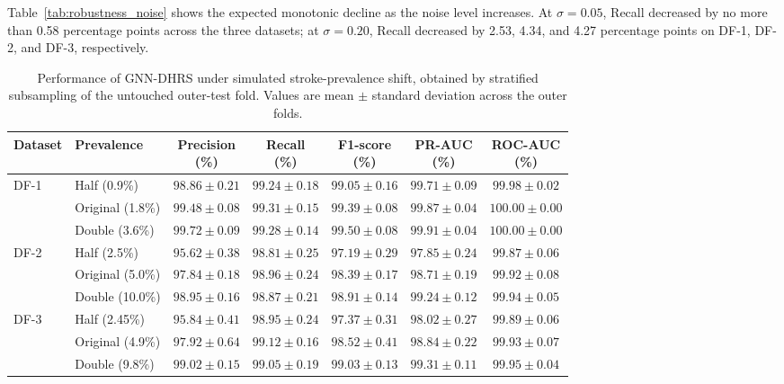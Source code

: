 \documentclass[pdflatex,sn-mathphys-num]{sn-jnl}%
\theoremstyle{thmstyleone}%
\theoremstyle{thmstyletwo}%
\theoremstyle{thmstylethree}%
\begin{document}
{ {
Table~\ref{tab:robustness_noise} shows the expected monotonic decline as the
noise level increases. At $\sigma=0.05$, Recall decreased by no more than
0.58 percentage points across the three datasets; at $\sigma=0.20$, Recall
decreased by 2.53, 4.34, and 4.27 percentage points on DF-1, DF-2, and DF-3,
respectively.
}

\begingroup
 
\begin{table}[!ht]
\centering
\caption{
Performance of GNN-DHRS under simulated stroke-prevalence shift, obtained by
stratified subsampling of the untouched outer-test fold. Values are mean
$\pm$ standard deviation across the outer folds.
}
\label{tab:robustness_prevalence}
\small
\setlength{\tabcolsep}{4.5pt}
\renewcommand{\arraystretch}{1.08}
\begin{tabular}{@{}llccccc@{}}
\toprule
\textbf{Dataset} & \textbf{Prevalence} &
\shortstack{\textbf{Precision}\\\textbf{(\%)}} &
\shortstack{\textbf{Recall}\\\textbf{(\%)}} &
\shortstack{\textbf{F1-score}\\\textbf{(\%)}} &
\shortstack{\textbf{PR-AUC}\\\textbf{(\%)}} &
\shortstack{\textbf{ROC-AUC}\\\textbf{(\%)}} \\
\midrule
\multirow{3}{*}{DF-1}
& Half (0.9\%)     & $98.86\pm0.21$ & $99.24\pm0.18$ & $99.05\pm0.16$ & $99.71\pm0.09$ & $99.98\pm0.02$ \\
& Original (1.8\%) & $99.48\pm0.08$ & $99.31\pm0.15$ & $99.39\pm0.08$ & $99.87\pm0.04$ & $100.00\pm0.00$ \\
& Double (3.6\%)   & $99.72\pm0.09$ & $99.28\pm0.14$ & $99.50\pm0.08$ & $99.91\pm0.04$ & $100.00\pm0.00$ \\
\midrule
\multirow{3}{*}{DF-2}
& Half (2.5\%)     & $95.62\pm0.38$ & $98.81\pm0.25$ & $97.19\pm0.29$ & $97.85\pm0.24$ & $99.87\pm0.06$ \\
& Original (5.0\%) & $97.84\pm0.18$ & $98.96\pm0.24$ & $98.39\pm0.17$ & $98.71\pm0.19$ & $99.92\pm0.08$ \\
& Double (10.0\%)  & $98.95\pm0.16$ & $98.87\pm0.21$ & $98.91\pm0.14$ & $99.24\pm0.12$ & $99.94\pm0.05$ \\
\midrule
\multirow{3}{*}{DF-3}
& Half (2.45\%)    & $95.84\pm0.41$ & $98.95\pm0.24$ & $97.37\pm0.31$ & $98.02\pm0.27$ & $99.89\pm0.06$ \\
& Original (4.9\%) & $97.92\pm0.64$ & $99.12\pm0.16$ & $98.52\pm0.41$ & $98.84\pm0.22$ & $99.93\pm0.07$ \\
& Double (9.8\%)   & $99.02\pm0.15$ & $99.05\pm0.19$ & $99.03\pm0.13$ & $99.31\pm0.11$ & $99.95\pm0.04$ \\
\bottomrule
\end{tabular}


\end{table}}
\end{document}
